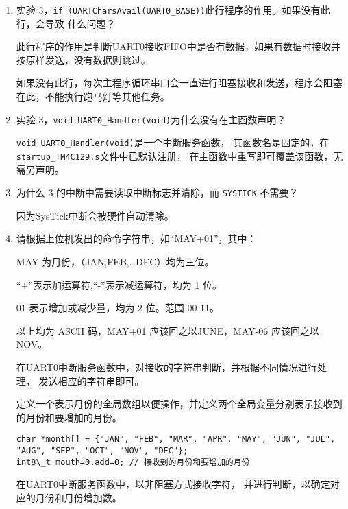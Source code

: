 \documentclass[12pt, a4paper, oneside]{ctexart}
\begin{document}
    \begin{enumerate}[listparindent=2em]
        \item 实验 3，\verb|if (UARTCharsAvail(UART0_BASE))|此行程序的作用。如果没有此行，会导致
        什么问题？

        {\kaishu 此行程序的作用是判断UART0接收FIFO中是否有数据，如果有数据时接收并按原样发送，没有数据则跳过。
        
        如果没有此行，每次主程序循环串口会一直进行阻塞接收和发送，程序会阻塞在此，不能执行跑马灯等其他任务。}

        \item 实验 3，\verb|void UART0_Handler(void)|为什么没有在主函数声明？
        
        {\kaishu \verb|void UART0_Handler(void)|是一个中断服务函数，
        其函数名是固定的，在\verb|startup_TM4C129.s|文件中已默认注册，
        在主函数中重写即可覆盖该函数，无需另声明。}
        
        \item 为什么 3 的中断中需要读取中断标志并清除，而 \verb|SYSTICK| 不需要？
        
        {\kaishu 因为SysTick中断会被硬件自动清除。}

        \item 请根据上位机发出的命令字符串，如“MAY+01”，其中：
        
        MAY 为月份，（JAN,FEB,…DEC）均为三位。

        “+”表示加运算符,“-”表示减运算符，均为 1 位。

        01 表示增加或减少量，均为 2 位。范围 00-11。

        以上均为 ASCII 码，MAY+01 应该回之以JUNE，MAY-06 应该回之以 NOV。

        {\kaishu 在UART0中断服务函数中，对接收的字符串判断，并根据不同情况进行处理，
        发送相应的字符串即可。
        
        定义一个表示月份的全局数组以便操作，并定义两个全局变量分别表示接收到的月份和要增加的月份。}
        
    \begin{lstlisting}     
char *month[] = {"JAN", "FEB", "MAR", "APR", "MAY", "JUN", "JUL", "AUG", "SEP", "OCT", "NOV", "DEC"};  
int8\_t mouth=0,add=0; // 接收到的月份和要增加的月份
    \end{lstlisting}

        {\kaishu 在UART0中断服务函数中，以非阻塞方式接收字符，
        并进行判断，以确定对应的月份和月份增加数。}


\end{enumerate}
\end{document}
